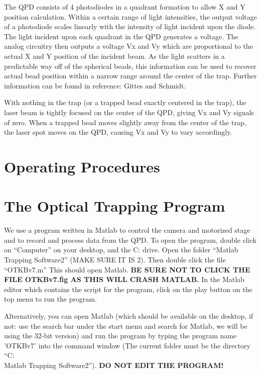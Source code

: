 \documentclass{../lab}
\begin{document}
The QPD consists of 4 photodiodes in a quadrant formation to allow X and Y position calculation. Within a certain range of light intensities, the output voltage of a photodiode scales linearly with the intensity of light incident upon the diode. The light incident upon each quadrant in the QPD generates a voltage. The analog circuitry then outputs a voltage Vx and Vy which are proportional to the actual X and Y position of the incident beam. As the light scatters in a predictable way off of the spherical beads, this information can be used to recover actual bead position within a narrow range around the center of the trap. Further information can be found in reference: Gittes and Schmidt.

With nothing in the trap (or a trapped bead exactly centered in the trap), the laser beam is tightly focused on the center of the QPD, giving Vx and Vy signals of zero. When a trapped bead moves slightly away from the center of the trap, the laser spot moves on the QPD, causing Vx and Vy to vary accordingly.

\section{Operating Procedures}

\section{The Optical Trapping Program}

We use a program written in Matlab to control the camera and motorized stage and to record and process data from the QPD. To open the program, double click on ``Computer'' on your desktop, and the C: drive. Open the folder ``Matlab Trapping Software2'' (MAKE SURE IT IS 2). Then double click the file ``OTKBv7.m'' This should open Matlab. \textbf{BE SURE NOT TO CLICK THE FILE OTKBv7.fig AS THIS WILL CRASH MATLAB.} In the Matlab editor which contains the script for the program, click on the play button on the top menu to run the program.

Alternatively, you can open Matlab (which should be available on the desktop, if not: use the search bar under the start menu and search for Matlab, we will be using the 32-bit version) and run the program by typing the program name 'OTKBv7' into the command window (The current folder must be the directory ``C:\\Matlab Trapping Software2''). \textbf{DO NOT EDIT THE PROGRAM!}
\end{document}
